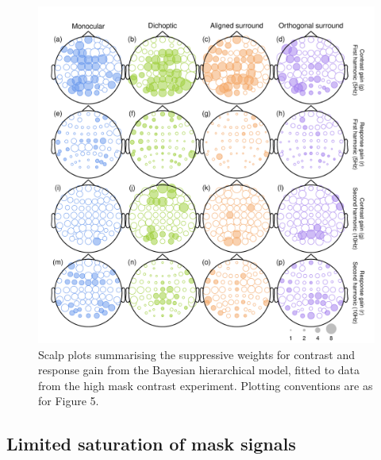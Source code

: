 \documentclass[]{article}
\begin{document}
\begin{figure}

{\centering \includegraphics{figures/modelheads2} 

}

\caption{Scalp plots summarising the suppressive weights for contrast and response gain from the Bayesian hierarchical model, fitted to data from the high mask contrast experiment. Plotting conventions are as for Figure 5.}\label{fig:modelheads2}
\end{figure}

\hypertarget{limited-saturation-of-mask-signals}{%
\subsection{Limited saturation of mask signals}\label{limited-saturation-of-mask-signals}}
\end{document}
